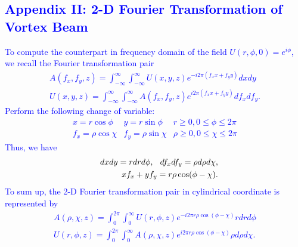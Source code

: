 \textcolor{blue}{
\section*{Appendix II: 2-D Fourier Transformation of Vortex Beam}
To compute the counterpart in frequency domain of the field $U(r, \phi, 0) = e^{i\phi}$, we recall the Fourier transformation pair
\begin{eqnarray}
A(f_x, f_y, z) = \int_{-\infty}^{\infty} \int_{-\infty}^{\infty} U(x, y, z)
e^{-i 2 \pi (f_x x + f_y y)} dx dy
\nonumber\\
U(x, y, z) = \int_{-\infty}^{\infty} \int_{-\infty}^{\infty} A(f_x, f_y, z)
e^{i 2 \pi (f_x x + f_y y)} df_x df_y.
\nonumber
\end{eqnarray}
Perform the following change of variable:
\begin{eqnarray}
	x = r\cos\phi & y = r\sin\phi & r \ge 0, 0 \le \phi \le 2\pi
	\nonumber\\
	f_x = \rho\cos\chi & f_y = \rho\sin\chi & \rho \ge 0, 0 \le \chi \le 2\pi
	\nonumber
\end{eqnarray}
Thus, we have
\begin{eqnarray}
	&&dx dy = r dr d\phi, \hspace{0.1in} df_x df_y = \rho d\rho d\chi,
	\nonumber\\
	&&xf_x + yf_y = r\rho \cos(\phi - \chi).
	\nonumber
\end{eqnarray}
To sum up, the 2-D Fourier transformation pair in cylindrical coordinate is represented by
\begin{eqnarray}
	A(\rho, \chi, z) = \int_{0}^{2\pi} \int_{0}^{\infty} U(r, \phi, z)
	e^{-i 2 \pi r \rho \cos(\phi - \chi)} r dr d\phi
	\nonumber\\
	U(r, \phi, z) = \int_{0}^{2\pi} \int_{0}^{\infty} A(\rho, \chi, z)
	e^{i 2 \pi r \rho \cos(\phi - \chi)} \rho d\rho d\chi.
	\nonumber
\end{eqnarray}
}

